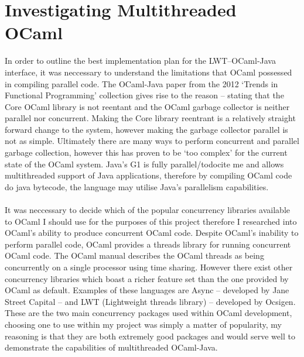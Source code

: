 \documentclass[12pt,twoside,notitlepage]{report}
\begin{document}
%
%
\section{Investigating Multithreaded OCaml}
\label{sec:investigating_multithreaded_ocaml}
%
%
In order to outline the best implementation plan for the LWT--OCaml-Java interface, it was neccessary to understand the limitations that OCaml possessed in compiling parallel code. The OCaml-Java paper from the 2012 `Trends in
Functional Programming' collection\cite{clerc2012} gives rise to the reason -- stating that the Core OCaml library is not reentant and the OCaml garbage collector is neither parallel nor concurrent. Making the Core library reentrant
is a relatively straight forward change to the system, however making the garbage collector parallel is not as simple. Ultimately there are many ways to perform concurrent and parallel garbage collection, however this has proven to be
`too complex' for the current state of the OCaml system. Java's G1 is fully parallel/todo{cite me} and allows multithreaded support of Java applications, therefore by compiling OCaml code
do java bytecode, the language may utilise Java's parallelism capabilities.
\\
\\
%
%
It was neccessary to decide which of the popular concurrency libraries available to OCaml I should use for the purposes of this project therefore I researched into OCaml's ability to produce concurrent OCaml code. Despite OCaml's
inability to perform parallel code, OCaml provides a threads library for running concurrent OCaml code. The OCaml manual\cite{leroy2013} describes the OCaml threads as being concurrently on a single processor using
time sharing. However there exist other concurrency libraries which boast a richer feature set than the one provided by OCaml as default. Examples of these languages are Async -- developed by Jane Street Capital -- and LWT
(Lightweight threads library) -- developed by Ocsigen. These are the two main concurrency packages used within OCaml development, choosing one to use within my project was simply a matter of popularity, my reasoning is that they are
both extremely good packages and would serve well to demonstrate the capabilities of multithreaded OCaml-Java.
\\
\\
\end{document}
